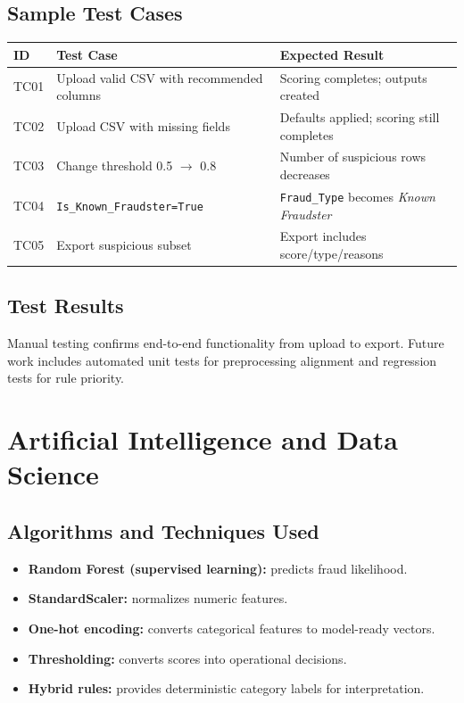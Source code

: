 \documentclass[12pt,a4paper]{report}
\begin{document}
\section{Sample Test Cases}
\begin{longtable}{p{1.8cm}p{7.4cm}p{4.4cm}}
\toprule
\textbf{ID} & \textbf{Test Case} & \textbf{Expected Result} \\\midrule
TC01 & Upload valid CSV with recommended columns & Scoring completes; outputs created \\
TC02 & Upload CSV with missing fields & Defaults applied; scoring still completes \\
TC03 & Change threshold 0.5 $\rightarrow$ 0.8 & Number of suspicious rows decreases \\
TC04 & \texttt{Is\_Known\_Fraudster=True} & \texttt{Fraud\_Type} becomes \textit{Known Fraudster} \\
TC05 & Export suspicious subset & Export includes score/type/reasons \\
\bottomrule
\end{longtable}

\section{Test Results}
Manual testing confirms end-to-end functionality from upload to export. Future work includes automated unit tests for preprocessing alignment and regression tests for rule priority.

\chapter{Artificial Intelligence and Data Science}
\section{Algorithms and Techniques Used}
\begin{itemize}
  \item \textbf{Random Forest (supervised learning):} predicts fraud likelihood.
  \item \textbf{StandardScaler:} normalizes numeric features.
  \item \textbf{One-hot encoding:} converts categorical features to model-ready vectors.
  \item \textbf{Thresholding:} converts scores into operational decisions.
  \item \textbf{Hybrid rules:} provides deterministic category labels for interpretation.
\end{itemize}
\end{document}
